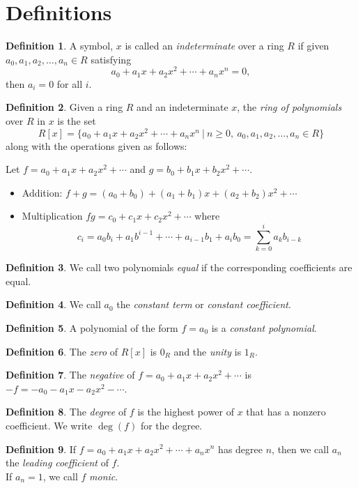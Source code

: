 \documentclass[12pt]{article}
\theoremstyle{definition}
\newtheorem*{defn}{Definition}
\begin{document}
\section*{Definitions}

\begin{defn}
	A symbol, $x$ is called an \emph{indeterminate} over a ring $R$ if given $a_0,a_1,a_2,\dots,a_n\in R$ satisfying
		\[a_0+a_1x+a_2 x^2+\cdots+a_nx^n=0,\]
	then $a_i=0$ for all $i$.
\end{defn}
\begin{defn}
	Given a ring $R$ and an indeterminate $x$, the \emph{ring of polynomials} over $R$ in $x$ is the set
		\[R[x] = \{a_0+a_1x+a_2x^2+\cdots+a_nx^n\ |\ n\geq 0,\ a_0,a_1,a_2,\dots,a_n\in R\}\]
	along with the operations given as follows:
	
	Let $f = a_0+a_1 x+a_2 x^2 +\cdots$ and $g = b_0+b_1 x+b_2 x^2+\cdots$.
	\begin{itemize}
		\item Addition: $f+g = (a_0+b_0) + (a_1+b_1)x + (a_2+b_2)x^2 + \cdots$
		\item Multiplication $fg = c_0+c_1x+c_2x^2+\cdots$ where
			\[c_i = a_0 b_i+a_1b^{i-1}+\cdots+a_{i-1}b_1+a_i b_0 = \sum_{k=0}^i a_k b_{i-k}\]
	\end{itemize}
\end{defn}
\begin{defn}
	We call two polynomials \emph{equal} if the corresponding coefficients are equal.  
\end{defn}
\begin{defn}
	We call $a_0$ the \emph{constant term} or \emph{constant coefficient}. 
\end{defn}
\begin{defn}
	A polynomial of the form $f=a_0$ is a \emph{constant polynomial}.
\end{defn}
\begin{defn}
	The \emph{zero} of $R[x]$ is $0_R$ and the \emph{unity} is $1_R$.
\end{defn}
\begin{defn}
 	The \emph{negative} of $f=a_0+a_1x+a_2x^2+\cdots$ is $-f=-a_0-a_1x-a_2x^2-\cdots$.
\end{defn}
\begin{defn}
 The \emph{degree} of $f$ is the highest power of $x$ that has a nonzero coefficient.  We write $\deg(f)$ for the degree.
\end{defn}
\begin{defn}
	If $f=a_0+a_1x+a_2x^2+\cdots +a_nx^n$ has degree $n$, then we call $a_n$ the \emph{leading coefficient} of $f$.\\  If $a_n=1$, we call $f$ \emph{monic}.
\end{defn}
\end{document}
